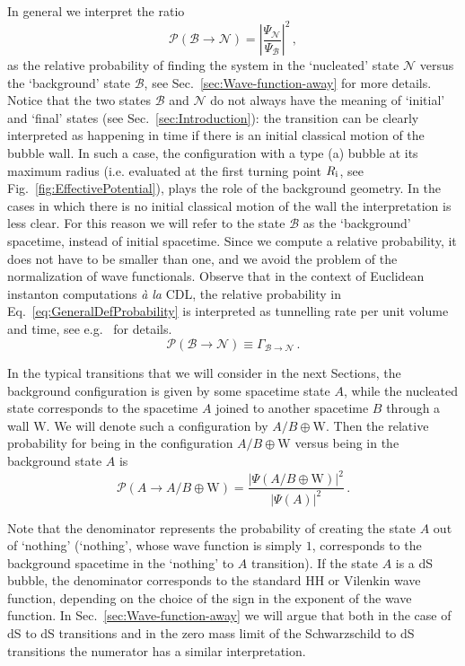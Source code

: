 \documentclass[11pt,a4paper]{article}
\begin{document}
\noindent In general we interpret the ratio
\begin{equation}
\label{eq:GeneralDefProbability}
\mathcal{P}(\mathcal{B} \rightarrow \mathcal{N}) = \left|\frac{\Psi_{\mathcal{N}}}{\Psi_{\mathcal{B}}}\right|^2 \,,
\end{equation}
as the relative probability of finding the system in the `nucleated' state $\mathcal{N}$ versus the `background' state $\mathcal{B}$, see Sec.~\ref{sec:Wave-function-away} for more details. Notice that the two states $\mathcal{B}$ and $\mathcal{N}$ do not always have the meaning of `initial' and `final' states (see Sec.~\ref{sec:Introduction}): the transition can be clearly interpreted as happening in time if there is an initial classical motion of the bubble wall. In such a case, the configuration with a type (a) bubble at its maximum radius (i.e. evaluated at the first turning point $R_{\rm i}$, see Fig.~\ref{fig:EffectivePotential}), plays the role of the background geometry. In the cases in which there is no initial classical motion of the wall the interpretation is less clear. For this reason we will refer to the state $\mathcal{B}$ as the `background' spacetime, instead of initial spacetime. Since we compute a  relative probability, it does not have to be smaller than one, and we avoid the problem of the normalization of wave functionals. Observe that in the context of Euclidean instanton computations \textit{à la} CDL, the relative probability in Eq.~\eqref{eq:GeneralDefProbability} is interpreted as tunnelling rate per unit volume and time, see e.g.~\cite{Weinberg:2012pjx} for details.
\begin{equation}
\mathcal{P}(\mathcal{B} \rightarrow \mathcal{N}) \equiv \Gamma_{\mathcal{B} \rightarrow \mathcal{N}} \,.
\end{equation}

In the typical transitions that we will consider in the next Sections, the background configuration is given by some spacetime state $A$, while the nucleated state corresponds to the spacetime $A$ joined to another spacetime $B$ through a wall $\text{W}$. We will denote such a configuration by $A/B\oplus \text{W}$. Then the relative probability for being in the configuration $A/B\oplus \text{W}$ versus being in the background state $A$ is
\begin{equation}
\mathcal{P}(A\rightarrow A/B\oplus \text{W}) = \frac{|\Psi(A/B\oplus \text{W})|^{2}}{|\Psi(A)|^{2}} \,. \label{eq:Psi}
\end{equation}

Note that the denominator represents the probability of creating the state $A$ out of `nothing' (`nothing', whose wave function is simply $1$, corresponds to the background spacetime in the `nothing' to $A$ transition). If the state $A$ is a dS bubble, the denominator corresponds to the standard HH or Vilenkin wave function, depending on the choice of the sign in the exponent of the wave function. In Sec.~\ref{sec:Wave-function-away} we will argue that both in the case of dS to dS transitions and in the zero mass limit of the Schwarzschild to dS transitions the numerator has a similar interpretation.
\end{document}
